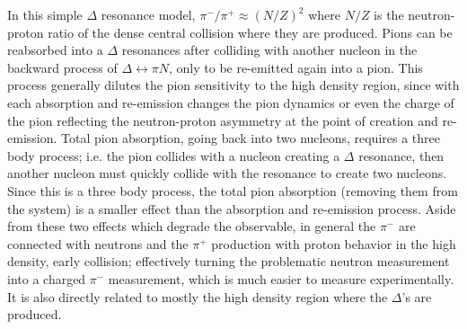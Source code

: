 In this simple $\Delta$ resonance model, $\pi^-/\pi^+ \approx (N/Z)^2$ where $N/Z$ is the neutron-proton ratio of the dense central collision where they are produced. Pions can be reabsorbed into a $\Delta$ resonances after colliding with another nucleon in the backward process of $\Delta \leftrightarrow \pi N$, only to be re-emitted again into a pion. This process generally dilutes the pion sensitivity to the high density region, since with each absorption and re-emission changes the pion dynamics or even the charge of the pion reflecting the neutron-proton asymmetry at the point of creation and re-emission. Total pion absorption, going back into two nucleons, requires a three body process; i.e. the pion collides with a nucleon creating a $\Delta$ resonance, then another nucleon must quickly collide with the resonance to create two nucleons. Since this is a three body process, the total pion absorption (removing them from the system) is a smaller effect than the absorption and re-emission process. Aside from these two effects which degrade the observable, in general the $\pi^-$ are connected with neutrons and the $\pi^+$ production with proton behavior in the high density, early collision; effectively turning the problematic neutron measurement into a charged $\pi^-$ measurement, which is much easier to measure experimentally. It is also directly related to mostly the high density region where the $\Delta$'s are produced.  

